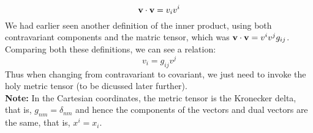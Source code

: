 $$\boldsymbol{\mathbf{v}}\cdot\boldsymbol{\mathbf{v}} = v_i v^i $$
\noindent
We had earlier seen another definition of the inner product, using both contravariant components and the matric tensor, which was $\boldsymbol{\mathbf{v}}\cdot\boldsymbol{\mathbf{v}} = v^i v^j g_{ij}$. Comparing both these definitions, we can see a relation:
$$v_i = g_{ij} v^j$$
Thus when changing from contravariant to covariant, we just need to invoke the holy metric tensor (to be dicussed later further).\\[0.3cm]
\noindent
\textbf{Note:} In the Cartesian coordinates, the metric tensor is the Kronecker delta, that is, $g_{nm} = \delta_{nm}$ and hence the components of the vectors and dual vectors are the same, that is, $x^i = x_i$. 